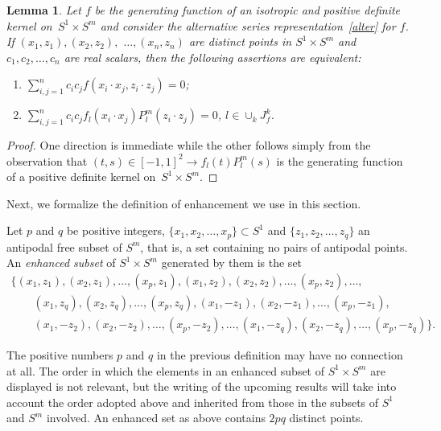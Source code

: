 \documentclass[pdftex]{sigma}
\numberwithin{equation}{section}
\newtheorem{Lemma}[Theorem]{Lemma}
\begin{document}
\begin{Lemma}\label{basic}
Let $f$ be the generating function of an isotropic and positive definite kernel on~\mbox{$S^1 \times S^m$} and consider the alternative series representation~\eqref{alter} for $f$. If $(x_1,z_1),(x_2,z_2),$ $ \ldots, (x_n,z_n)$ are distinct points in $S^1 \times S^m$ and $c_1, c_2, \ldots, c_n$ are real scalars, then the following assertions are equivalent:
\begin{enumerate}\itemsep=0pt
\item[$(i)$] $\sum\limits_{i,j=1}^n c_i c_j f(x_i \cdot x_j,z_i \cdot z_j)=0$;
\item[$(ii)$] $\sum\limits_{i,j=1}^n c_i c_j f_l(x_i \cdot x_j) P_l^m(z_i \cdot z_j)=0$, $l\in \cup_{k}J_f^k$.
\end{enumerate}
\end{Lemma}
\begin{proof}
One direction is immediate while the other follows simply from the observation that $(t,s) \in [-1,1]^2 \to f_l(t)P_l^m(s)$ is the generating function of a positive def\/inite kernel \linebreak on~\mbox{$S^1 \times S^m$}.
\end{proof}

Next, we formalize the def\/inition of enhancement we use in this section.

\begin{Definition} Let $p$ and $q$ be positive integers, $\{x_1,x_2, \ldots, x_p\} \subset S^1$ and $\{z_1,z_2, \ldots, z_q\}$ an antipodal free subset of $S^m$, that is, a set containing no pairs of antipodal points. An {\em enhanced subset} of $S^1 \times S^m$ generated by them is the set
\begin{gather*}\big\{(x_1,z_1), (x_2,z_1), \ldots, (x_p,z_1), (x_1,z_2), (x_2,z_2), \ldots, (x_p,z_2),\ldots, \\
\qquad{} (x_1,z_q),(x_2,z_q),\ldots, (x_p,z_q), (x_1,-z_1), (x_2,-z_1), \ldots, (x_p,-z_1), \\
\qquad{} (x_1,-z_2), (x_2,-z_2), \ldots,(x_p,-z_2),\ldots, (x_1,-z_q), (x_2,-z_q), \ldots, (x_p,-z_q)\big\}.\end{gather*}
\end{Definition}

The positive numbers $p$ and $q$ in the previous def\/inition may have no connection at all. The order in which the elements in an enhanced subset of $S^1 \times S^m$ are displayed is not relevant, but the writing of the upcoming results will take into account the order adopted above and inherited from those in the subsets of $S^1$ and $S^m$ involved. An enhanced set as above contains $2pq$ distinct points.
\end{document}
